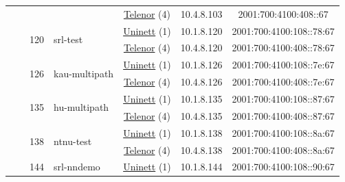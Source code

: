 \begin{small}
\begin{center}
\begin{longtable}{|c|c|c|c|c|c|c|c|}
  &  & \multicolumn{2}{|c|}{} & \multicolumn{2}{|c|}{\tiny{\href{https://www.telenor.no}{Telenor} (4)}} & \tiny{10.4.8.103} & \tiny{2001:700:4100:408::67} \\* \cline{3-3}\cline{4-4}\cline{5-5}\cline{6-6}\cline{7-7}\cline{8-8}
  &  & \multirow{2}{*}{\tiny{120}} & \multicolumn{1}{|l|}{\multirow{2}{*}{\tiny{srl-test}}} & \multicolumn{2}{|c|}{\tiny{\href{https://www.uninett.no}{Uninett} (1)}} & \tiny{10.1.8.120} & \tiny{2001:700:4100:108::78:67} \\* \cline{5-5}\cline{6-6}\cline{7-7}\cline{8-8}
  &  &  &  & \multicolumn{2}{|c|}{\tiny{\href{https://www.telenor.no}{Telenor} (4)}} & \tiny{10.4.8.120} & \tiny{2001:700:4100:408::78:67} \\* \cline{3-3}\cline{4-4}\cline{5-5}\cline{6-6}\cline{7-7}\cline{8-8}
  &  & \multirow{2}{*}{\tiny{126}} & \multicolumn{1}{|l|}{\multirow{2}{*}{\tiny{kau-multipath}}} & \multicolumn{2}{|c|}{\tiny{\href{https://www.uninett.no}{Uninett} (1)}} & \tiny{10.1.8.126} & \tiny{2001:700:4100:108::7e:67} \\* \cline{5-5}\cline{6-6}\cline{7-7}\cline{8-8}
  &  &  &  & \multicolumn{2}{|c|}{\tiny{\href{https://www.telenor.no}{Telenor} (4)}} & \tiny{10.4.8.126} & \tiny{2001:700:4100:408::7e:67} \\* \cline{3-3}\cline{4-4}\cline{5-5}\cline{6-6}\cline{7-7}\cline{8-8}
  &  & \multirow{2}{*}{\tiny{135}} & \multicolumn{1}{|l|}{\multirow{2}{*}{\tiny{hu-multipath}}} & \multicolumn{2}{|c|}{\tiny{\href{https://www.uninett.no}{Uninett} (1)}} & \tiny{10.1.8.135} & \tiny{2001:700:4100:108::87:67} \\* \cline{5-5}\cline{6-6}\cline{7-7}\cline{8-8}
  &  &  &  & \multicolumn{2}{|c|}{\tiny{\href{https://www.telenor.no}{Telenor} (4)}} & \tiny{10.4.8.135} & \tiny{2001:700:4100:408::87:67} \\* \cline{3-3}\cline{4-4}\cline{5-5}\cline{6-6}\cline{7-7}\cline{8-8}
  &  & \multirow{2}{*}{\tiny{138}} & \multicolumn{1}{|l|}{\multirow{2}{*}{\tiny{ntnu-test}}} & \multicolumn{2}{|c|}{\tiny{\href{https://www.uninett.no}{Uninett} (1)}} & \tiny{10.1.8.138} & \tiny{2001:700:4100:108::8a:67} \\* \cline{5-5}\cline{6-6}\cline{7-7}\cline{8-8}
  &  &  &  & \multicolumn{2}{|c|}{\tiny{\href{https://www.telenor.no}{Telenor} (4)}} & \tiny{10.4.8.138} & \tiny{2001:700:4100:408::8a:67} \\* \cline{3-3}\cline{4-4}\cline{5-5}\cline{6-6}\cline{7-7}\cline{8-8}
  &  & \multirow{2}{*}{\tiny{144}} & \multicolumn{1}{|l|}{\multirow{2}{*}{\tiny{srl-nndemo}}} & \multicolumn{2}{|c|}{\tiny{\href{https://www.uninett.no}{Uninett} (1)}} & \tiny{10.1.8.144} & \tiny{2001:700:4100:108::90:67} \\* \cline{5-5}\cline{6-6}\cline{7-7}\cline{8-8}

\end{longtable}
\end{center}
\end{small}

